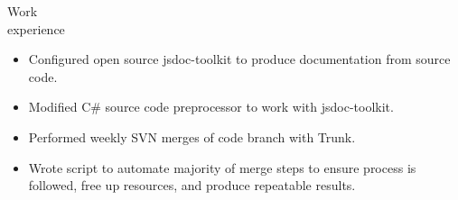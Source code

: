 \begin{category}{Work \\experience}
\begin{itemize}
\item Configured open source jsdoc-toolkit to produce documentation from source code.
\item Modified C\# source code preprocessor to work with jsdoc-toolkit. %

\item Performed weekly SVN merges of code branch with Trunk. %
\item Wrote script to automate majority of merge steps to ensure process is followed, free up resources, and produce repeatable results. %



\end{itemize}



\end{category}
